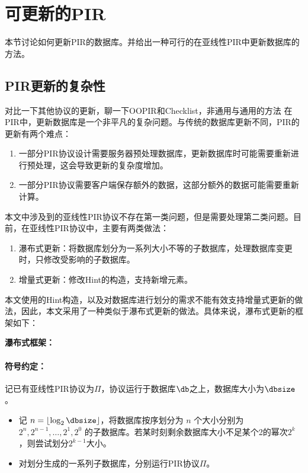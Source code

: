 \section{可更新的PIR}
\label{sec:handling-updates}
本节讨论如何更新PIR的数据库。并给出一种可行的在亚线性PIR中更新数据库的方法。

\subsection{PIR更新的复杂性}

{对比一下其他协议的更新，聊一下OOPIR和Checklist，非通用与通用的方法}
在PIR中，更新数据库是一个非平凡的复杂问题。与传统的数据库更新不同，PIR的更新有两个难点：
\begin{enumerate}
    \item 一部分PIR协议设计需要服务器预处理数据库，更新数据库时可能需要重新进行预处理，这会导致更新的复杂度增加。
    \item 一部分PIR协议需要客户端保存额外的数据，这部分额外的数据可能需要重新计算。
\end{enumerate}

本文中涉及到的亚线性PIR协议不存在第一类问题，但是需要处理第二类问题。目前，在亚线性PIR协议中，主要有两类做法：
\begin{enumerate}
    \item 瀑布式更新\cite{Checklist}：将数据库划分为一系列大小不等的子数据库，处理数据库变更时，只修改受影响的子数据库。
    \item 增量式更新\cite{USENIX:MZRA22}：修改Hint的构造，支持新增元素。
\end{enumerate}

本文使用的Hint构造，以及对数据库进行划分的需求不能有效支持增量式更新的做法，因此，本文采用了一种类似于瀑布式更新的做法。具体来说，瀑布式更新的框架如下：

    \begin{mdframed}
    \centering
    \textbf{瀑布式框架：}
        \raggedright
        \paragraph{符号约定：} 记已有亚线性PIR协议为$\Pi$，协议运行于数据库$\db$之上，数据库大小为$\dbsize$。
        \begin{itemize}
            \item 记 $n = \lfloor\log_2{\dbsize}\rfloor$，将数据库按序划分为 $n$ 个大小分别为 $2^n, 2^{n-1}, \dots, 2^1, 2^0$ 的子数据库。若某时刻剩余数据库大小不足某个2的幂次$2^k$，则尝试划分$2^{k-1}$大小。
            \item 对划分生成的一系列子数据库，分别运行PIR协议$\Pi$。
        \end{itemize}
    \end{mdframed}
    \label{fig:checklist}

